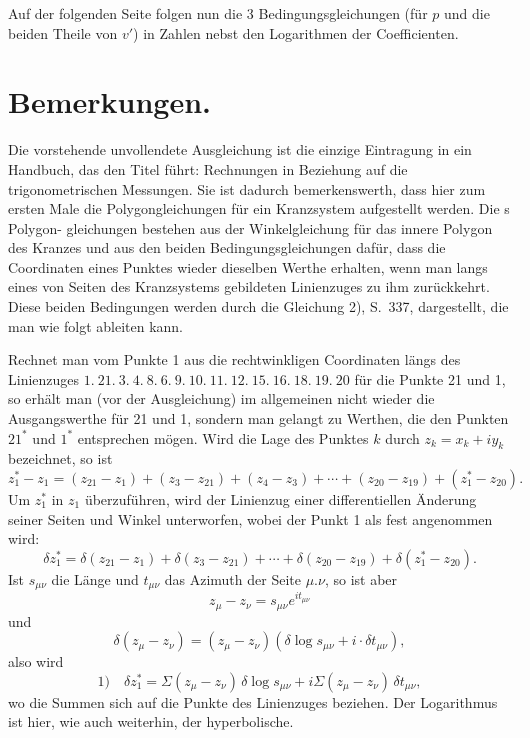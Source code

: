 \documentclass[12pt,a4paper]{article}
\theoremstyle{plain}
\theoremstyle{definition}
\theoremstyle{remark}
\begin{document}
Auf der folgenden Seite folgen nun die 3 Bedingungsgleichungen (f\"ur $p$ und die beiden Theile von $v'$) in Zahlen nebst den Logarithmen der Coefficienten.

\newpage
\section*{Bemerkungen.}
\label{sec:bemerkungen-ende}

Die vorstehende unvollendete Ausgleichung ist die einzige Eintragung in ein Handbuch, das den Titel f\"uhrt: \glqq{}Rechnungen in Beziehung auf die trigonometrischen Messungen\grqq{}. Sie ist dadurch bemerkenswerth, dass hier zum ersten Male die Polygongleichungen f\"ur ein Kranzsystem aufgestellt werden. Die s Polygon- gleichungen bestehen aus der Winkelgleichung f\"ur das innere Polygon des Kranzes und aus den beiden Bedingungsgleichungen daf\"ur, dass die Coordinaten eines Punktes wieder dieselben Werthe erhalten, wenn man langs eines von Seiten des Kranzsystems gebildeten Linienzuges zu ihm zur\"uckkehrt. Diese beiden Bedingungen werden durch die Gleichung 2), S.\ 337, dargestellt, die man wie folgt ableiten kann.

Rechnet man vom Punkte 1 aus die rechtwinkligen Coordinaten l\"angs des Linienzuges $1.\ 21.\ 3.\ 4.\ 8.\ 6.\ 9.\ 10.\ 11.\ 12.\ 15.\ 16.\ 18.\ 19.\ 20$ f\"ur die Punkte 21 und 1, so erh\"alt man (vor der Ausgleichung) im allgemeinen nicht wieder die Ausgangswerthe f\"ur 21 und 1, sondern man gelangt zu Werthen, die den Punkten $21^*$ und $1^*$ entsprechen m\"ogen. Wird die Lage des Punktes $k$ durch $z_k = x_k + iy_k$ bezeichnet, so ist
\[z_1^* - z_1 = (z_{21} - z_1) + (z_3 - z_{21}) + (z_4 - z_3) + \cdots + (z_{20} - z_{19}) + (z_1^* - z_{20}).\]
Um $z_1^*$ in $z_1$ \"uberzuf\"uhren, wird der Linienzug einer differentiellen \"Anderung seiner Seiten und Winkel unterworfen, wobei der Punkt 1 als fest angenommen wird:
\[\delta z_1^* = \delta(z_{21} - z_1) + \delta(z_3 - z_{21}) + \cdots + \delta(z_{20} - z_{19}) + \delta(z_1^* - z_{20}).\]
Ist $s_{\mu\nu}$ die L\"ange und $t_{\mu\nu}$ das Azimuth der Seite $\mu.\nu$, so ist aber
\[z_\mu - z_\nu = s_{\mu\nu} e^{it_{\mu\nu}}\]
und
\[\delta(z_\mu - z_\nu) = (z_\mu - z_\nu)(\delta\log s_{\mu\nu} + i \cdot \delta t_{\mu\nu}),\]
also wird
\[\text{1)}\quad \delta z_1^* = \Sigma(z_\mu - z_\nu)\,\delta\log s_{\mu\nu} + i\Sigma(z_\mu - z_\nu)\,\delta t_{\mu\nu},\]
wo die Summen sich auf die Punkte des Linienzuges beziehen. Der Logarithmus ist hier, wie auch weiterhin, der hyperbolische.
\end{document}
